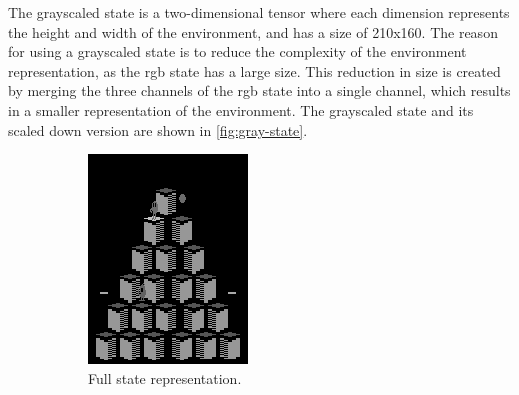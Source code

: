 The grayscaled state is a two-dimensional tensor where each dimension
represents the height and width of the environment, and has a size of 210x160.
The reason for using a grayscaled state is to reduce the complexity of the
environment representation, as the \gls{rgb} state has a large size. This
reduction in size is created by merging the three channels of the \gls{rgb}
state into a single channel, which results in a smaller representation of the
environment. The grayscaled state and its scaled down version are shown in
\cref{fig:gray-state}.

\begin{figure}[H]
    \centering
    \begin{subfigure}{0.45\textwidth}
        \centering
        \includegraphics[width=\textwidth]{img/gray-full-purple-sam.png}
        \caption{Full state representation.}
        \label{fig:rgb-full}
    \end{subfigure}
    \begin{subfigure}{0.45\textwidth}

\end{subfigure}
\end{figure}
